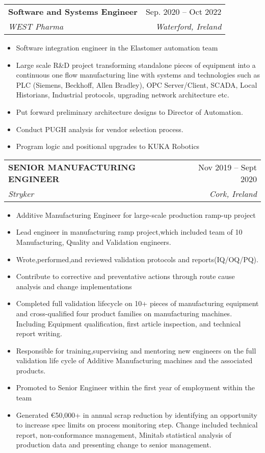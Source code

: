 \documentclass[letterpaper,11pt]{article}
\makeatletter
\newcommand{\resumeItem}[1]{
  \item\small{
    {#1 \vspace{-2pt}}
  }
}
\newcommand{\resumeSubheading}[4]{
  \vspace{-2pt}\item
    \begin{tabular*}{0.97\textwidth}[t]{l@{\extracolsep{\fill}}r}
      \textbf{#1} & #2 \\
      \textit{\small#3} & \textit{\small #4} \\
    \end{tabular*}\vspace{-7pt}
}
\newcommand{\resumeSubSubheading}[2]{
    \item
    \begin{tabular*}{0.97\textwidth}{l@{\extracolsep{\fill}}r}
      \textit{\small#1} & \textit{\small #2} \\
    \end{tabular*}\vspace{-7pt}
}
\newcommand{\resumeSubHeadingListEnd}{\end{itemize}}
\newcommand{\resumeItemListStart}{\begin{itemize}}
\newcommand{\resumeItemListEnd}{\end{itemize}\vspace{-5pt}}
\makeatother
\begin{document}

    \resumeSubheading
      {Software and Systems Engineer}{Sep. 2020 -- Oct 2022}
      {WEST Pharma}{Waterford, Ireland}
      \resumeItemListStart
        \resumeItem{Software integration engineer in the Elastomer automation team}
        \resumeItem{Large scale R\&D project transforming standalone pieces of equipment into a continuous one flow manufacturing line with systems and technologies such as PLC (Siemens, Beckhoff, Allen Bradley), OPC Server/Client, SCADA, Local Historians, Industrial protocols, upgrading network architecture etc.}
        \resumeItem{Put forward preliminary architecture designs to Director of Automation.}
        \resumeItem{Conduct PUGH analysis for vendor selection process.}
        \resumeItem{Program logic and positional upgrades to KUKA Robotics}
    \resumeItemListEnd

    \resumeSubheading
      {SENIOR MANUFACTURING ENGINEER}{Nov 2019 -- Sept 2020}
      {Stryker}{Cork, Ireland}
      \resumeItemListStart
        \resumeItem{Additive Manufacturing Engineer for large-scale production ramp-up project}
        \resumeItem{Lead engineer in manufacturing ramp project,which included team of 10 Manufacturing, Quality and Validation engineers.}
        \resumeItem{Wrote,performed,and reviewed validation protocols and reports(IQ/OQ/PQ).}
        \resumeItem{Contribute to corrective and preventative actions through route cause analysis and change implementations}
        \resumeItem{Completed full validation lifecycle on 10+ pieces of manufacturing equipment and cross-qualified four product families on manufacturing machines. Including Equipment qualification, first article inspection, and technical report writing.}
        \resumeItem{Responsible for training,supervising and mentoring new engineers on the full validation life cycle of Additive Manufacturing machines and the associated products.}
        \resumeItem{Promoted to Senior Engineer within the first year of employment within the team}
        \resumeItem{Generated €50,000+ in annual scrap reduction by identifying an opportunity to increase spec limits on process monitoring step.
        Change included technical report, non-conformance management, Minitab statistical analysis of production data and presenting change to senior management.}
  \resumeSubHeadingListEnd
\end{document}
